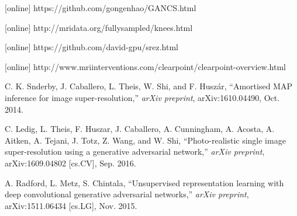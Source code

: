 \documentclass{journal}
\begin{document}
%



\begin{thebibliography}{10}
	
\small
		
		 [online] https://github.com/gongenhao/GANCS.html
		
		 [online] http://mridata.org/fullysampled/knees.html
		
		 [online] https://github.com/david-gpu/srez.html
		
		 [online] http://www.mriinterventions.com/clearpoint/clearpoint-overview.html
		
		
		
		 C. K. S\IeC {\o }nderby, J. Caballero, L. Theis, W. Shi, and F. Huszár,
		\newblock ``Amortised MAP inference for image super-resolution,''
		\newblock \emph{arXiv preprint}, arXiv:1610.04490, Oct. 2014.
		
		
%		
		
		
		
		
		 C. Ledig, L. Theis, F. Huszar, J. Caballero, A. Cunningham, A. Acosta, A. Aitken, A. Tejani, J. Totz, Z. Wang, and W. Shi,
		\newblock ``Photo-realistic single image super-resolution using a generative adversarial network,''
		\newblock \emph{arXiv preprint}, arXiv:1609.04802 [cs.CV], Sep. 2016.
		
		
		 A. Radford, L. Metz, S. Chintala,
		\newblock ``Unsupervised representation learning with deep convolutional generative adversarial networks,''
		\newblock \emph{arXiv preprint}, arXiv:1511.06434 [cs.LG], Nov. 2015.
		

\end{thebibliography}
\end{document}
